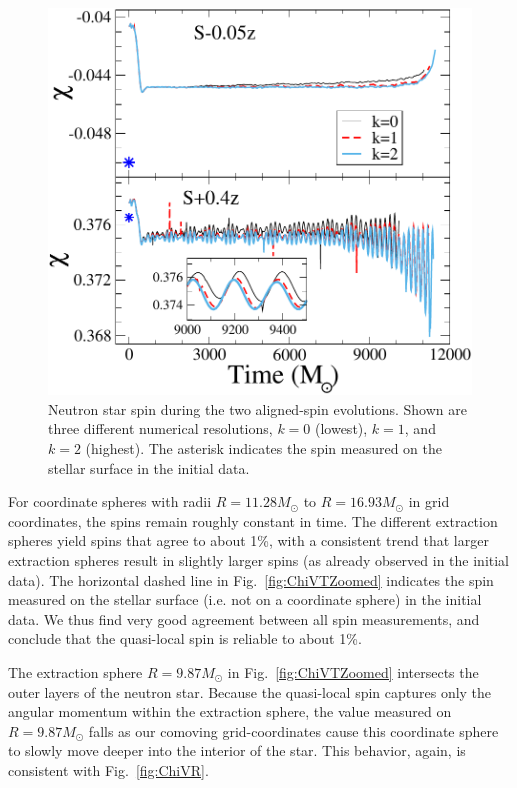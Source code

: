 {%
\begin{figure}
\includegraphics[width=0.99\columnwidth]{chap2/ChiVTDifferentRes2}
\caption[Neutron star spin during the two aligned-spin evolutions.]{{\label{fig:ChiVTDifferentRes2}} Neutron star spin during the
  two aligned-spin evolutions.  Shown are three different numerical
  resolutions, $k=0$ (lowest), $k=1$, and $k=2$ (highest). The
  asterisk indicates the spin measured on the stellar surface in the
  initial data.}
\end{figure}

For coordinate spheres with radii $R=11.28M_\odot$ to $R=16.93M_\odot$
in grid coordinates, the spins remain roughly constant in time.  The
different extraction spheres yield spins that agree to about 1\%, with
a consistent trend that larger extraction spheres result in slightly
larger spins (as already observed in the initial data).  The
horizontal dashed line in Fig.~\ref{fig:ChiVTZoomed} indicates the
spin measured on the stellar surface (i.e. not on a coordinate sphere)
in the initial data.  We thus find very good agreement between all
spin measurements, and conclude that the quasi-local spin is reliable
to about 1\%.

The extraction sphere $R=9.87M_\odot$ in Fig.~\ref{fig:ChiVTZoomed}
intersects the outer layers of the neutron star.  Because the
quasi-local spin captures only the angular momentum within the
extraction sphere, the value measured on $R=9.87M_\odot$ falls as our
comoving grid-coordinates cause this coordinate sphere to slowly move
deeper into the interior of the star.  This behavior, again, is
consistent with Fig.~\ref{fig:ChiVR}.

}
